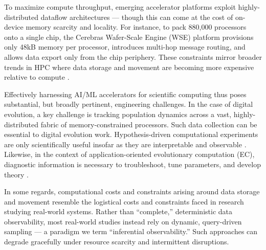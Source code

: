 To maximize compute throughput, emerging accelerator platforms exploit highly-distributed dataflow architectures --- though this can come at the cost of on-device memory scarcity and locality.
For instance, to pack 880,000 processors onto a single chip, the Cerebras Wafer-Scale Engine (WSE) platform provisions only 48kB memory per processor, introduces multi-hop message routing, and allows data export only from the chip periphery.
These constraints mirror broader trends in HPC where data storage and movement are becoming more expensive relative to compute \cite{Buluc2021,khan2021analysis,gholami2024ai}.


Effectively harnessing AI/ML accelerators for scientific computing thus poses substantial, but broadly pertinent, engineering challenges.
In the case of digital evolution, a key challenge is tracking population dynamics across a vast, highly-distributed fabric of memory-constrained processors.
Such data collection can be essential to digital evolution work.
Hypothesis-driven computational experiments are only scientifically useful insofar as they are interpretable and observable \cite{casti1997wouldbe}.
Likewise, in the context of application-oriented evolutionary computation (EC), diagnostic information is necessary to troubleshoot, tune parameters, and develop theory \cite{hernandez2022dossier,Hooker1995}.

In some regards, computational costs and constraints arising around data storage and movement resemble the logistical costs and constraints faced in research studying real-world systems.
Rather than ``complete,'' deterministic data observability, most real-world studies instead rely on dynamic, query-driven sampling --- a paradigm we term ``inferential observability.''
Such approaches can degrade gracefully under resource scarcity and intermittent disruptions.


